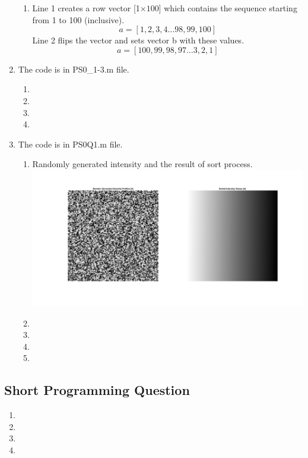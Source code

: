 \documentclass[man]{apa6}
\begin{document}
\begin{enumerate}
\begin{enumerate}
				\item Line 1 creates a row vector [1$\times100$] which contains the sequence starting from 1 to 100 (inclusive).
					$$a= [1,2,3,4 \dots 98,99,100]$$
					Line 2 flips the vector and sets vector b with these values.
					$$a= [100,99,98,97 \dots 3,2,1]$$	
			\end{enumerate}
		
		\item The code is in PS0\_1-3.m file.
			\begin{enumerate}
			
				\item 
				
				\item \item \item 
			\end{enumerate}
		
		\item The code is in PS0Q1.m file.
		
			\begin{enumerate}
				\item Randomly generated intensity and the result of sort process.
					\includegraphics[width=\linewidth]{PS0-4.png}
			
				\item %
				
				\item %
				
				\item %
				
				\item %
				
				
			\end{enumerate}
		
	\end{enumerate}

\subsection{Short Programming Question}
	\begin{enumerate}
		\item
		\item
		\item
		\item
	\end{enumerate}
\end{document}
